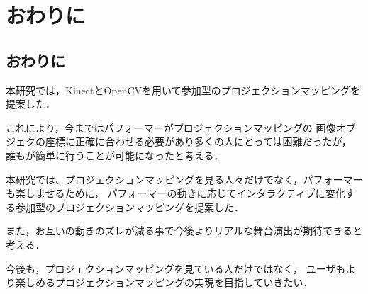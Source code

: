 \chapter{おわりに}
\thispagestyle{fancy}

\section{おわりに}

本研究では，KinectとOpenCVを用いて参加型のプロジェクションマッピングを提案した．

これにより，今まではパフォーマーがプロジェクションマッピングの
画像オブジェクの座標に正確に合わせる必要があり多くの人にとっては困難だったが，
誰もが簡単に行うことが可能になったと考える．

本研究では、プロジェクションマッピングを見る人々だけでなく，パフォーマーも楽しませるために，
パフォーマーの動きに応じてインタラクティブに変化する参加型のプロジェクションマッピングを提案した．

また，お互いの動きのズレが減る事で今後よりリアルな舞台演出が期待できると考える．

今後も，プロジェクションマッピングを見ている人だけではなく，
ユーザもより楽しめるプロジェクションマッピングの実現を目指していきたい．


